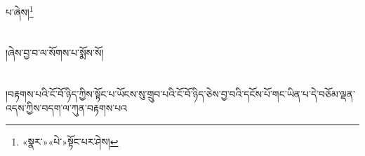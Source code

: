 པ་ཞེས།\footnote{«སྣར་»«པེ་»སྟོང་པར་ཤེས།}\chapter{ }།ཞེས་བྱ་བ་ལ་སོགས་པ་སྨོས་སོ།\chapter{ }།བརྟགས་པའི་ངོ་བོ་ཉིད་ཀྱིས་སྟོང་པ་ཡོངས་སུ་གྲུབ་པའི་ངོ་བོ་ཉིད་ཅེས་བྱ་བའི་དངོས་པོ་གང་ཡིན་པ་དེ་བཅོམ་ལྡན་འདས་ཀྱིས་བདག་ལ་ཀུན་བརྟགས་པའ